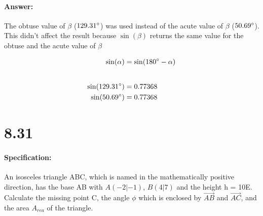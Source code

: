\documentclass{article}
\begin{document}
\pagebreak

\paragraph{Answer:}
The obtuse value of $\beta$ ($129.31^\circ$) was used instead of the acute value of $\beta$ 
($\cosanginv^\circ$). This didn't affect the result because 
$\sin(\beta)$ returns the same value for the obtuse and the acute value of $\beta$


\begin{align*}
    \sin(\alpha) &= \sin(180^\circ - \alpha) \\[20pt]
    \sin(\cosang^\circ) &= \sinofang \\
    \sin(\cosanginv^\circ) &= \sinofanginv 
\end{align*}

\pagebreak

\section*{8.31}
\paragraph{Specification:}
An isosceles triangle ABC, which is named in the mathematically positive direction, has the 
base AB with $A(-2|-1)$, $B(4|7)$ and the height h = 10E. Calculate the missing point C, the angle
$\phi$ which is enclosed by $\vec{AB}$ and $\vec{AC}$, and the area $A_{rea}$ of the triangle.

\def\height{10}

\def\A{\begin{pmatrix}
    -2 \\ 
    -1
\end{pmatrix}}

\def\B{\begin{pmatrix}
    4 \\ 
    7
\end{pmatrix}}

\def\AB{\begin{pmatrix}
    6 \\ 
    8
\end{pmatrix}}

\def\ABhalf{\begin{pmatrix}
    3 \\ 
    4
\end{pmatrix}}

\def\ABmid{\begin{pmatrix}
    1 \\ 
    3
\end{pmatrix}}
\end{document}
